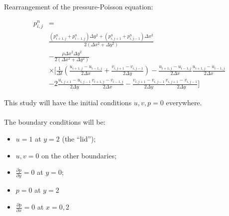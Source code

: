 \documentclass{article}
\begin{document}
\noindent  Rearrangement of the pressure-Poisson equation:

\begin{equation}
	\begin{aligned}
		p_{i,j}^{n} & =
		\\
		            & \frac{\left(p_{i+1,j}^{n}+p_{i-1,j}^{n}\right)
			\Delta y^2 +
			\left(p_{i,j+1}^{n}+p_{i,j-1}^{n}\right) \Delta
			x^2}{2\left(\Delta x^2+\Delta
			y^2\right)}
		\\
		            & -\frac{\rho\Delta x^2\Delta y^2}{2\left(\Delta
		x^2+\Delta y^2\right)}                                       \\
		            & \times \biggr[\frac{1}{\Delta
			t}\left(\frac{u_{i+1,j}-u_{i-1,j}}{2\Delta
			x}+\frac{v_{i,j+1}-v_{i,j-1}}{2\Delta y}\right)
		-\frac{u_{i+1,j}-u_{i-1,j}}{2\Delta
		x}\frac{u_{i+1,j}-u_{i-1,j}}{2\Delta x}                      \\
		            & - 2\frac{u_{i,j+1}-u_{i,j-1}}{2\Delta
		y}\frac{v_{i+1,j}-v_{i-1,j}}{2\Delta x}-
		\frac{v_{i,j+1}-v_{i,j-1}}{2\Delta
		y}\frac{v_{i,j+1}-v_{i,j-1}}{2\Delta y}\biggr]
	\end{aligned}
\end{equation}
\linebreak
\linebreak

\begin{boxA}
	This study will have the initial conditions $u, v, p = 0$
	everywhere. \\
	\\
	The boundary conditions will be:
	\begin{itemize}
		\item $u=1$ at $y=2$ (the ``lid'');
		\item $u, v=0$ on the other boundaries;
		\item $\frac{\partial p}{\partial y}=0$ at $y=0$;
		\item $p=0$ at $y=2$
		\item $\frac{\partial p}{\partial x}=0$ at $x=0,2$
	\end{itemize}
\end{boxA}
\end{document}
